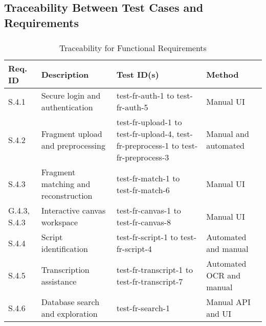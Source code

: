 \documentclass[12pt, titlepage]{article}
\begin{document}
\newline
\subsection{Traceability Between Test Cases and Requirements}

\subsubsection{}

\begin{table}[ht]
    \centering
    \begin{tabular}{|p{2cm}|p{4cm}|p{4cm}|p{2.5cm}|}
        \hline
        \textbf{Req. ID} & \textbf{Description} & \textbf{Test ID(s)} & \textbf{Method} \\
        \hline
        S.4.1 & Secure login and authentication & test-fr-auth-1 to test-fr-auth-5 & Manual UI \\
        \hline
        S.4.2 & Fragment upload and preprocessing & test-fr-upload-1 to test-fr-upload-4, test-fr-preprocess-1 to test-fr-preprocess-3 & Manual and automated \\
        \hline
        S.4.3 & Fragment matching and reconstruction & test-fr-match-1 to test-fr-match-6 & Manual UI \\
        \hline
        G.4.3, S.4.3 & Interactive canvas workspace & test-fr-canvas-1 to test-fr-canvas-8 & Manual UI \\
        \hline
        S.4.4 & Script identification & test-fr-script-1 to test-fr-script-4 & Automated and manual \\
        \hline
        S.4.5 & Transcription assistance & test-fr-transcript-1 to test-fr-transcript-7 & Automated OCR and manual \\
        \hline
        S.4.6 & Database search and exploration & test-fr-search-1 & Manual API and UI \\
        \hline
    \end{tabular}
    \caption{Traceability for Functional Requirements}
\end{table}
\end{document}
